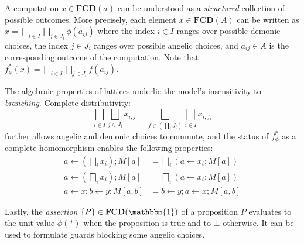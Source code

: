 \documentclass[sigplan,screen]{acmart}
\begin{document}
A computation $x \in \mathbf{FCD}(a)$
can be understood as
a \emph{structured} collection of possible outcomes.
More precisely,
each element $x \in \mathbf{FCD}(A)$ can be written as
$
    x = \bigsqcap_{i \in I} \bigsqcup_{j \in J_i} \phi(a_{ij})
$
where
the index $i \in I$ ranges over possible demonic choices,
the index $j \in J_i$ ranges over possible angelic choices,
and $a_{ij} \in A$ is the corresponding outcome of the computation.
Note that
$f_\phi^*(x) = \bigsqcap_{i \in I} \bigsqcup_{j \in J_i} f(a_{ij})$.

The algebraic properties of lattices
underlie the model's insensitivity to \emph{branching}.
Complete distributivity:
\[
    \bigsqcap_{i \in I} \bigsqcup_{j \in J_i} x_{i,j} =
    \bigsqcup_{f \in (\prod_i J_i)} \bigsqcap_{i \in I} x_{i, f_i}
\]
further allows angelic and demonic choices to commute,
and the status of $f^*_\phi$ as a complete homomorphism
enables the following properties:
\begin{align*}
    a \leftarrow \left( \bigsqcup_i x_i \right) ; M[a] &=
      \bigsqcup_i (a \leftarrow x_i ; M[a])
    \\
    a \leftarrow \left( \bigsqcap_i x_i \right) ; M[a] &=
      \bigsqcap_i (a \leftarrow x_i ; M[a])
    \\
    a \leftarrow x ; b \leftarrow y ; M[a,b] &=
    b \leftarrow y ; a \leftarrow x ; M[a,b]
\end{align*}

Lastly,
the \emph{assertion} $\{P\} \in \mathbf{FCD}(\mathbbm{1})$ of a proposition $P$
evaluates to the unit value $\phi(*)$ when the proposition is true
and to $\bot$ otherwise.
It can be used to formulate guards
blocking some angelic choices.

%
%

\end{document}
